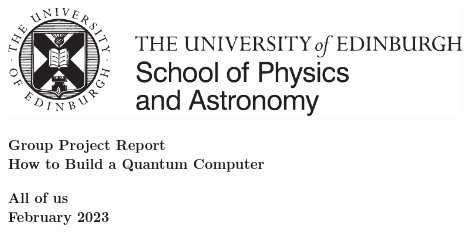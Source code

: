\documentclass[12pt]{article}
\begin{document}





\pagestyle{empty}                       %

\par\noindent\includegraphics[width=12cm]{images/PandA_crest.pdf}

\par\noindent                                           %
\vspace*{2cm}
\begin{center}
        \Large\bf \Large\bf Group Project Report\\
        \LARGE\bf How to Build a Quantum Computer
\end{center}
\vspace*{0.5cm}
\begin{center}
        \bf All of us\\                               %
        February 2023                              %
\end{center}
\vspace*{5mm}
%
\end{document}
